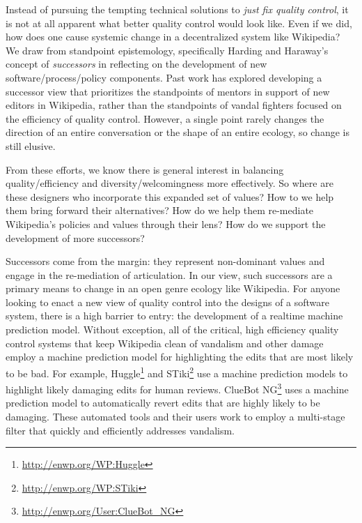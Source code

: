 Instead of pursuing the tempting technical solutions to \emph{just fix quality control}, it is not at all apparent what better quality control would look like.  Even if we did, how does one cause systemic change in a decentralized system like Wikipedia?  We draw from standpoint epistemology, specifically Harding and Haraway's concept of \emph{successors}\cite{haraway1988situated}\cite{harding1987feminism} in reflecting on the development of new software/process/policy components.  Past work has explored developing a successor view that prioritizes the standpoints of mentors in support of new editors in Wikipedia, rather than the standpoints of vandal fighters focused on the efficiency of quality control\cite{halfaker2014snuggle}\cite{geiger2014successor}. However, a single point rarely changes the direction of an entire conversation or the shape of an entire ecology, so change is still elusive.

From these efforts, we know there is general interest in balancing quality/efficiency and diversity/welcomingness more effectively.  So where are these designers who incorporate this expanded set of values?  How to we help them bring forward their alternatives?  How do we help them re-mediate Wikipedia's policies and values through their lens?  How do we support the development of more successors?

Successors come from the margin: they represent non-dominant values and engage in the re-mediation of articulation\cite{mugar2017preserving}.  In our view, such successors are a primary means to change in an open genre ecology like Wikipedia.  For anyone looking to enact a new view of quality control into the designs of a software system, there is a high barrier to entry: the development of a realtime machine prediction model.  Without exception, all of the critical, high efficiency quality control systems that keep Wikipedia clean of vandalism and other damage employ a machine prediction model for highlighting the edits that are most likely to be bad. For example, Huggle\footnote{\url{http://enwp.org/WP:Huggle}} and STiki\footnote{\url{http://enwp.org/WP:STiki}} use a machine prediction models to highlight likely damaging edits for human reviews.  ClueBot NG\footnote{\url{http://enwp.org/User:ClueBot_NG}} uses a machine prediction model to automatically revert edits that are highly likely to be damaging.  These automated tools and their users work to employ a multi-stage filter that quickly and efficiently addresses vandalism\cite{geiger2013levee}.

